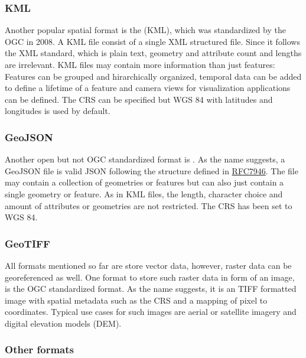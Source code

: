 		\subsubsection{KML}
		
			Another popular spatial format is the  (KML), which was standardized by the OGC in 2008\cite{ogc-kml-2.2}.
			A KML file consist of a single XML structured file.
			Since it follows the XML standard, which is plain text, geometry and attribute count and lengths are irrelevant.
			KML files may contain more information than just features:
			Features can be grouped and hirarchically organized, temporal data can be added to define a lifetime of a feature and camera views for visualization applications can be defined\cite{ogc-kml-2.3}.
			The CRS can be specified but WGS 84 with latitudes and longitudes is used by default.
		
		\subsubsection{GeoJSON}
		
			Another open but not OGC standardized format is .
			As the name suggests, a GeoJSON file is valid JSON following the structure defined in \href{https://datatracker.ietf.org/doc/html/rfc7946}{RFC7946}\cite{ietf-geojson}.
			The file may contain a collection of geometries or features but can also just contain a single geometry or feature.
			As in KML files, the length, character choice and amount of attributes or geometries are not restricted.
			The CRS has been set to WGS 84.
			
		\subsubsection{GeoTIFF}
		
			All formats mentioned so far are store vector data, however, raster data can be georeferenced as well.
			One format to store such raster data in form of an image, is the OGC standardized  format.
			As the name suggests, it is an TIFF formatted image with spatial metadata such as the CRS and a mapping of pixel to coordinates\cite{ogc-geotiff}.
			Typical use cases for such images are aerial or satellite imagery and digital elevation models (DEM).
			
		\subsubsection{Other formats}
		
